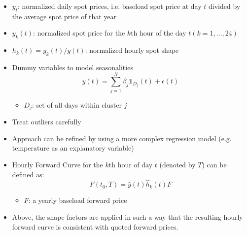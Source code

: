 \documentclass{beamer}
\begin{document}
\begin{frame}
    \begin{itemize}
        \item $y_t$: normalized daily spot prices, i.e. baseload spot price at day $t$ divided by the average spot price of that year

        \item $y_k(t)$: normalized spot price for the $k$th hour of the day $t (k = 1, \ldots, 24)$

        \item $h_k(t) = y_k(t) / y(t)$: normalized hourly spot shape

        \item Dummy variables to model seasonalities
              \[
                  y(t)
                  = \sum_{j = 1}^N \beta_j \mathds{1}_{D_j}(t) + \epsilon(t)
              \]
              \begin{itemize}
                  \item $D_j$: set of all days within cluster $j$
              \end{itemize}

        \item Treat outliers carefully

        \item Approach can be refined by using a more complex regression model (e.g. temperature as an explanatory variable)
    \end{itemize}
\end{frame}


\begin{frame}
    \begin{itemize}
        \item Hourly Forward Curve for the $k$th hour of day $t$ (denoted by $T$) can be defined as:
              \[
                  F(t_0, T) = \hat y(t) \hat h_k(t) F
              \]
              \begin{itemize}
                  \item $F$: a yearly baseload forward price
              \end{itemize}

        \item Above, the shape factors are applied in such a way that the resulting hourly forward curve is consistent with quoted forward prices.
    \end{itemize}
\end{frame}
\end{document}
